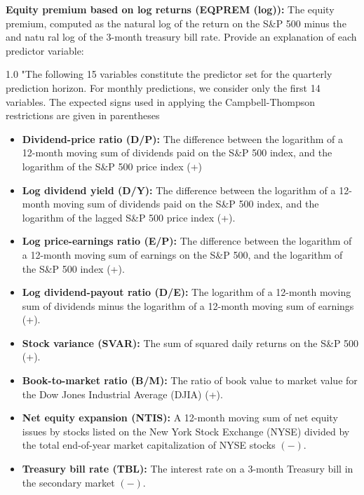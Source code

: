 \documentclass[a4paper,11pt]{article}
\begin{document}
\noindent \textbf{Equity premium based on log returns (EQPREM (log)):} The equity premium, computed as the natural log of the return on the S\&P 500 minus the and natu ral log of the 3-month treasury bill rate.
\citet{denkloffler2024} Provide an explanation of each predictor variable:
\\
\begin{spacing}{1.0}
\noindent "The following 15 variables constitute the predictor set for the quarterly prediction
horizon. For monthly predictions, we consider only the first 14 variables. The
expected signs used in applying the Campbell-Thompson restrictions are given in
parentheses
\begin{itemize}[noitemsep, topsep=0pt]
\item \textbf{Dividend-price ratio (D/P): } The difference between the logarithm of a
12-month moving sum of dividends paid on the S\&P 500 index, and the
logarithm of the S\&P 500 price index (+) 
\item \textbf{Log dividend yield (D/Y):} The difference between the logarithm of a 12-month moving sum of dividends paid on the S\&P 500 index, and the logarithm of the lagged S\&P 500 price index (+).

\item \textbf{Log price-earnings ratio (E/P):} The difference between the logarithm of a 12-month moving sum of earnings on the S\&P 500, and the logarithm of the S\&P 500 index (+).

\item \textbf{Log dividend-payout ratio (D/E):} The logarithm of a 12-month moving sum of dividends minus the logarithm of a 12-month moving sum of earnings (+).

\item \textbf{Stock variance (SVAR):} The sum of squared daily returns on the S\&P 500 (+).

\item \textbf{Book-to-market ratio (B/M):} The ratio of book value to market value for the Dow Jones Industrial Average (DJIA) (+).

\item \textbf{Net equity expansion (NTIS):} A 12-month moving sum of net equity issues by stocks listed on the New York Stock Exchange (NYSE) divided by the total end-of-year market capitalization of NYSE stocks $(-)$.

\item \textbf{Treasury bill rate (TBL):} The interest rate on a 3-month Treasury bill in the secondary market $(-)$.


\end{itemize}
\end{spacing}
\end{document}
